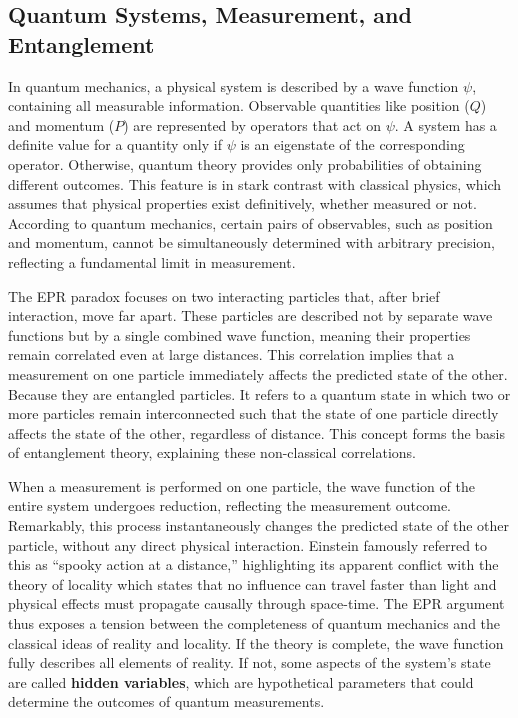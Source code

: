 \documentclass[14pt,a4paper]{extarticle}
\begin{document}
\subsection{Quantum Systems, Measurement, and Entanglement}
In quantum mechanics, a physical system is described by a wave function $\psi$, containing all measurable information. Observable quantities like position ($Q$) and momentum ($P$) are represented by operators that act on $\psi$. A system has a definite value for a quantity only if $\psi$ is an eigenstate of the corresponding operator. Otherwise, quantum theory provides only probabilities of obtaining different outcomes. This feature is in stark contrast with classical physics, which assumes that physical properties exist definitively, whether measured or not. According to quantum mechanics, certain pairs of observables, such as position and momentum, cannot be simultaneously determined with arbitrary precision, reflecting a fundamental limit in measurement.

The EPR paradox focuses on two interacting particles that, after brief interaction, move far apart. These particles are described not by separate wave functions but by a single combined wave function, meaning their properties remain correlated even at large distances. This correlation implies that a measurement on one particle immediately affects the predicted state of the other. Because they are entangled particles. It refers to a quantum state in which two or more particles remain interconnected such that the state of one particle directly affects the state of the other, regardless of distance. This concept forms the basis of entanglement theory, explaining these non-classical correlations.

When a measurement is performed on one particle, the wave function of the entire system undergoes reduction, reflecting the measurement outcome. Remarkably, this process instantaneously changes the predicted state of the other particle, without any direct physical interaction. Einstein famously referred to this as ``spooky action at a distance,'' highlighting its apparent conflict with the theory of locality which states that no influence can travel faster than light and physical effects must propagate causally through space-time. The EPR argument thus exposes a tension between the completeness of quantum mechanics and the classical ideas of reality and locality. If the theory is complete, the wave function fully describes all elements of reality. If not, some aspects of the system’s state are called \textbf{hidden variables}, which are hypothetical parameters that could determine the outcomes of quantum measurements.
\end{document}
